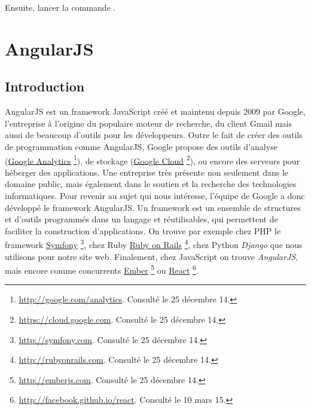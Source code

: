 \documentclass[a4paper,10pt,twoside]{sphinxmanual}
\begin{document}
Ensuite, lancer la commande .


\chapter{AngularJS}
\label{angularjs::doc}\label{angularjs:angularjs}

\section{Introduction}
\label{angularjs:introduction}
AngularJS est un framework JavaScript créé et maintenu depuis 2009 par Google, l'entreprise à l'origine du populaire moteur de recherche, du client Gmail mais aussi de beaucoup d'outils pour les développeurs. Outre le fait de créer des outils de programmation comme AngularJS, Google propose des outils d'analyse (\href{http://google.com/analytics}{Google Analytics} \footnote{
\href{http://google.com/analytics}{http://google.com/analytics}. Consulté le 25 décembre 14.
}), de stockage (\href{https://cloud.google.com}{Google Cloud} \footnote{
\href{https://cloud.google.com}{https://cloud.google.com}. Consulté le 25 décembre 14.
}), ou encore des serveurs pour héberger des applications. Une entreprise très présente non seulement dans le domaine public, mais également dans le soutien et la recherche des technologies informatiques. Pour revenir au sujet qui nous intéresse, l'équipe de Google a donc développé le framework AngularJS. Un framework est un ensemble de structures et d'outils programmés dans un langage et réutilisables, qui permettent de faciliter la construction d'applications. On trouve par exemple chez PHP le framework \href{http://symfony.com}{Symfony} \footnote{
\href{http://symfony.com}{http://symfony.com}. Consulté le 25 décembre 14.
}, chez Ruby \href{http://rubyonrails.com}{Ruby on Rails} \footnote{
\href{http://rubyonrails.com}{http://rubyonrails.com}. Consulté le 25 décembre 14.
}, chez Python \emph{Django} que nous utilisons pour notre site web. Finalement, chez JavaScript on trouve \emph{AngularJS}, mais encore comme concurrents \href{http://emberjs.com}{Ember} \footnote{
\href{http://emberjs.com}{http://emberjs.com}. Consulté le 25 décembre 14.
} ou \href{http://facebook.github.io/react/}{React} \footnote{
\href{http://facebook.github.io/react}{http://facebook.github.io/react}. Consulté le 10 mars 15.
}.
\end{document}
